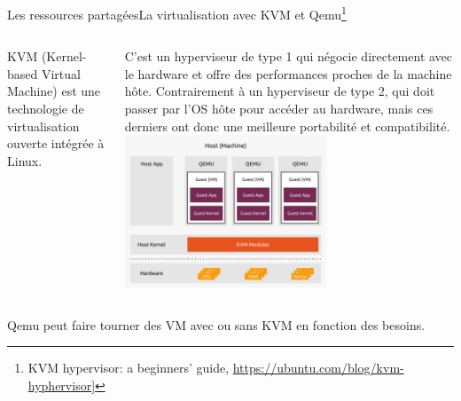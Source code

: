 \documentclass{beamer}
\begin{document}
    \begin{frame}{Les ressources partagées}{La virtualisation avec KVM et Qemu\footnote{\label{ubuntukvm}KVM hypervisor: a beginners’ guide, \url{https://ubuntu.com/blog/kvm-hyphervisor}]}}
        \begin{small}
            \begin{columns}
                KVM (Kernel-based Virtual Machine) est une technologie de virtualisation ouverte intégrée à Linux.

                C'est un hyperviseur de type 1 qui négocie directement avec le hardware et offre des performances proches de la machine hôte.
                Contrairement à un hyperviseur de type 2, qui doit passer par l'OS hôte pour accéder au hardware, mais ces derniers ont donc une meilleure portabilité et compatibilité.
                \centering
                \includegraphics[width=6cm]{image/kvm-qemu}
            \end{columns}
            \bigbreak
            Qemu peut faire tourner des VM avec ou sans KVM en fonction des besoins.
        \end{small}
    \end{frame}
\end{document}
